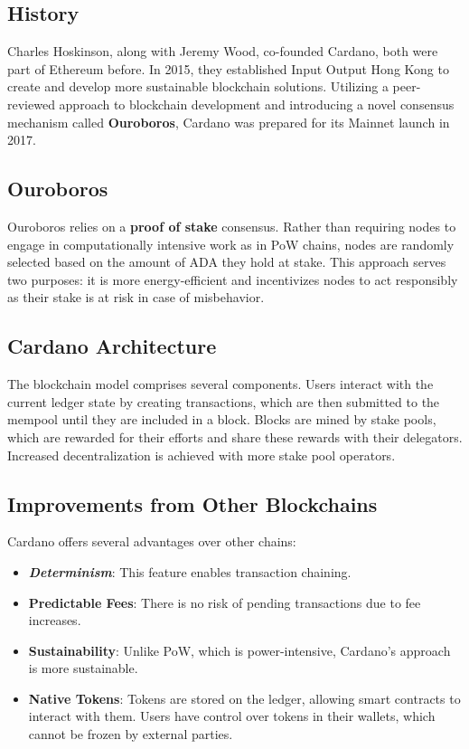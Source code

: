 \subsection{History} \label{sec:overwiew}

Charles Hoskinson, along with Jeremy Wood, co-founded Cardano, both were part of Ethereum before. In 2015, they established Input Output Hong Kong to create and develop more sustainable blockchain solutions. Utilizing a peer-reviewed approach to blockchain development and introducing a novel consensus mechanism called \textbf{Ouroboros}, Cardano was prepared for its Mainnet launch in 2017.

\subsection{Ouroboros}

Ouroboros relies on a \textbf{proof of stake} consensus. Rather than requiring nodes to engage in computationally intensive work as in PoW chains, nodes are randomly selected based on the amount of ADA they hold at stake. This approach serves two purposes: it is more energy-efficient and incentivizes nodes to act responsibly as their stake is at risk in case of misbehavior.

\subsection{Cardano Architecture}

The blockchain model comprises several components. Users interact with the current ledger state by creating transactions, which are then submitted to the mempool until they are included in a block. Blocks are mined by stake pools, which are rewarded for their efforts and share these rewards with their delegators. Increased decentralization is achieved with more stake pool operators.
\subsection{Improvements from Other Blockchains}

Cardano offers several advantages over other chains:

\begin{itemize}
\item \textbf{\textit{\gls{Determinism}}}: This feature enables transaction chaining.
\item \textbf{Predictable Fees}: There is no risk of pending transactions due to fee increases.
\item \textbf{Sustainability}: Unlike PoW, which is power-intensive, Cardano's approach is more sustainable.
\item \textbf{Native Tokens}: Tokens are stored on the ledger, allowing smart contracts to interact with them. Users have control over tokens in their wallets, which cannot be frozen by external parties.
\end{itemize}

